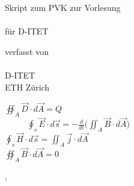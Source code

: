 

\thispagestyle{empty}  %
\large  %

\begin{center}

\vfill


Skript zum PVK zur Vorlesung\\[10mm]

{\LARGE\bfseries\mytitle} \\
\vspace{1cm}
für D-ITET
\vfill


verfasst von \\[5mm]
{\large\bfseries\myauthor}\\[5mm]
D-ITET\\
ETH Zürich \\
\vspace{4cm}
\end{center}
\begin{tcolorbox}
  \begin{center}
$ \displaystyle \oiint_A \vec{D} \cdot d \vec{A} = Q \  \ \ \ \  \ \ \ \ \ \ \ \ $ \\

$ \displaystyle  \ \ \ \  \ \ \ \   \ \ \ \ \oint_s \vec{E} \cdot d \vec{s} = - \frac{d}{dt} \bigg( \iint_A \vec{B} \cdot d \vec{A}  \bigg)$\\


$ \displaystyle \oint_s \vec{H} \cdot d \vec{s} = \iint_A \vec{j} \cdot d\vec{A}   \ \ \ \  $\\
$ \displaystyle \oiint_A \vec{B} \cdot d \vec{A} = 0 \     \   \ \ \ \  \ \ \ \   \ \ \ \  $\\
\end{center}
\end{tcolorbox}
\begin{center}
\vfill

\mysubmissiontown, \mysubmissionmonth~\mysubmissionyear

\end{center}
\normalsize %

\newpage


